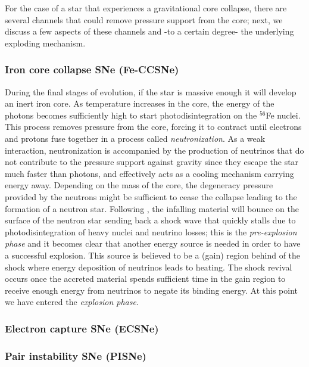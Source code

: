 \documentclass[../../main/thesis_msc.tex]{subfiles}
\begin{document}
				For the case of a star that experiences a gravitational core collapse, there are several channels that could remove pressure support from the core; next, we discuss a few aspects of these channels and -to a certain degree- the underlying exploding mechanism.
				
				\subsubsection{Iron core collapse SNe (Fe-CCSNe)}
					
					During the final stages of evolution, if the star is massive enough it will develop an inert iron core. As temperature increases in the core, the energy of the photons becomes sufficiently high to start photodisintegration on the $^{56}$Fe nuclei. This process removes pressure from the core, forcing it to contract until electrons and protons fuse together in a process called \emph{neutronization}. As a weak interaction, neutronization is accompanied by the production of neutrinos that do not contribute to the pressure support against gravity since they escape the star much faster than photons, and effectively acts as a cooling mechanism carrying energy away. Depending on the mass of the core, the degeneracy pressure provided by the neutrons might be sufficient to cease the collapse leading to the formation of a neutron star. Following \cite{Muller2016}, the infalling material will bounce on the surface of the neutron star sending back a shock wave that quickly stalls due to photodisintegration of heavy nuclei and neutrino losses; this is the \emph{pre-explosion phase} and it becomes clear that another energy source is needed in order to have a successful explosion. This source is believed to be a (gain) region behind of the shock where energy deposition of neutrinos leads to heating. The shock revival occurs once the accreted material spends sufficient time in the gain region to receive enough energy from neutrinos to negate its binding energy. At this point we have entered the \emph{explosion phase}.

				\subsubsection{Electron capture SNe (ECSNe)}
				
				
				
				\subsubsection{Pair instability SNe (PISNe)}
				
\end{document}

